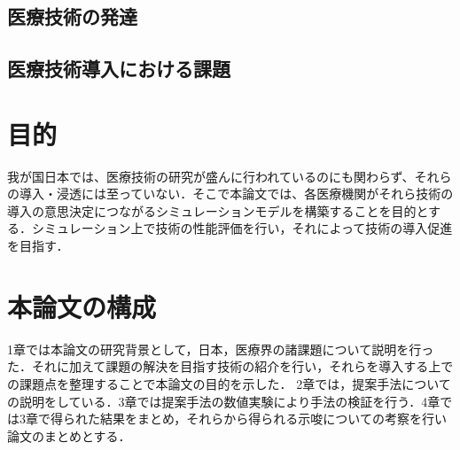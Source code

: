 \subsection{医療技術の発達}

\subsection{医療技術導入における課題}

\section{目的}

我が国日本では、医療技術の研究が盛んに行われているのにも関わらず、それらの導入・浸透には至っていない．そこで本論文では、各医療機関がそれら技術の導入の意思決定につながるシミュレーションモデルを構築することを目的とする．シミュレーション上で技術の性能評価を行い，それによって技術の導入促進を目指す．

\section{本論文の構成}

1章では本論文の研究背景として，日本，医療界の諸課題について説明を行った．それに加えて課題の解決を目指す技術の紹介を行い，それらを導入する上での課題点を整理することで本論文の目的を示した．
2章では，提案手法についての説明をしている．3章では提案手法の数値実験により手法の検証を行う．4章では3章で得られた結果をまとめ，それらから得られる示唆についての考察を行い論文のまとめとする．
